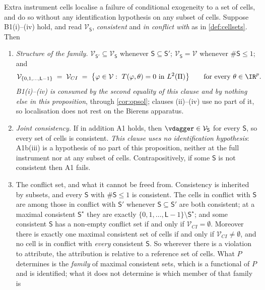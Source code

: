 \begin{proposition}\label{prp:localise}
Extra instrument cells localise a failure of conditional exogeneity to a set of cells, and do so without
any identification hypothesis on any subset of cells.
Suppose B1(i)--(iv) hold, and read $\mathcal V_{\mathsf S}$, \emph{consistent} and \emph{in conflict with}
as in \cref{def:cellsets}. Then
\begin{enumerate}
\item[(i)] \emph{Structure of the family.} $\mathcal V_{\mathsf S'}\subseteq\mathcal V_{\mathsf S}$
whenever $\mathsf S\subseteq\mathsf S'$; $\mathcal V_{\mathsf S}=\mathcal V$ whenever
$\#\mathsf S\le1$; and
\[
\mathcal V_{\{0,1,\dots,\mathsf L-1\}}\;=\;\mathcal V_{CI}\;=\;\big\{\varphi\in\mathcal V:\ T(\varphi,\theta)=0\ \text{in }L^{2}(\Pi)\big\}
\qquad\text{for every }\theta\in\IR^{p}.
\]
\emph{B1\textup{(i)}--\textup{(iv)} is consumed by the second equality of this clause and by nothing else
in this proposition}, through \cref{cor:opsol}; clauses \textup{(ii)}--\textup{(iv)} use no part of it, so
localisation does not rest on the Bierens apparatus.
\item[(ii)] \emph{Joint consistency.} If in addition A1 holds, then $\vdagger\in\mathcal V_{\mathsf S}$
for every $\mathsf S$, so every set of cells is consistent. \emph{This clause uses no identification
hypothesis}: A1b(iii) is a hypothesis of no part of this proposition, neither at the full instrument nor
at any subset of cells. Contrapositively, if some $\mathsf S$ is not consistent then A1 fails.
\item[(iii)] The conflict set, and what it cannot be freed from. Consistency is inherited by
subsets, and every $\mathsf S$ with $\#\mathsf S\le1$ is consistent. The cells in conflict with
$\mathsf S$ are among those in conflict with $\mathsf S'$ whenever $\mathsf S\subseteq\mathsf S'$ are
both consistent; at a maximal consistent $\mathsf S^{\star}$ they are exactly
$\{0,1,\dots,\mathsf L-1\}\setminus\mathsf S^{\star}$; and some consistent $\mathsf S$ has a non-empty
conflict set if and only if $\mathcal V_{CI}=\emptyset$. Moreover there is exactly one maximal consistent
set of cells if and only if $\mathcal V_{CI}\neq\emptyset$, and no cell is in conflict with \emph{every}
consistent $\mathsf S$. So wherever there is a violation to attribute, the attribution is relative
to a reference set of cells. What $P$ determines is the \emph{family} of maximal consistent sets, which
is a functional of $P$ and is identified; what it does not determine is which member of that family is

\end{enumerate}
\end{proposition}
